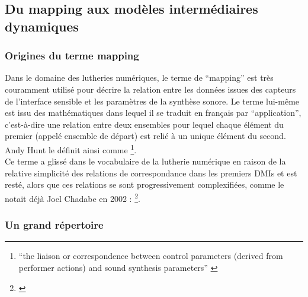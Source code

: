 \subsection{Du mapping aux modèles intermédiaires dynamiques}
\label{sec:algorithms:MID:mapping-to-MID}

\subsubsection{Origines du terme mapping} 

\noindent Dans le domaine des lutheries numériques, le terme de ``mapping'' est très couramment utilisé pour décrire la relation entre les données issues des capteurs de l'interface sensible et les paramètres de la synthèse sonore. Le terme lui-même est issu des mathématiques dans lequel il se traduit en français par ``application'', c'est-à-dire une relation entre deux ensembles pour lequel chaque élément du premier (appelé ensemble de départ) est relié à un unique élément du second. Andy Hunt le définit ainsi comme \footnote{``the liaison or correspondence between control parameters (derived from performer actions) and sound synthesis parameters'' \cite{hunt_towards_2000}}.\\
\indent Ce terme a glissé dans le vocabulaire de la lutherie numérique en raison de la relative simplicité des relations de correspondance dans les premiers \glspl{DMI} et est resté, alors que ces relations se sont progressivement complexifiées, comme le notait déjà Joel Chadabe en 2002 : \footnote{ \cite{chadabe_limitations_2002}}.

\subsubsection{Un grand répertoire}

